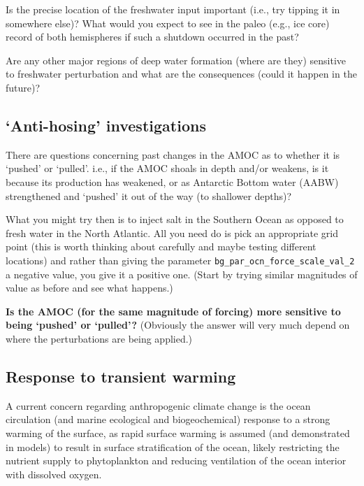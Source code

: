\documentclass[11pt,fleqn]{book} %
\begin{document}
Is the precise location of the freshwater input important (i.e., try tipping it in somewhere else)? What would you expect to see in the paleo (e.g., ice core) record of both hemispheres if such a shutdown occurred in the past?

Are any other major regions of deep water formation (where are they) sensitive to freshwater perturbation and what are the consequences (could it happen in the future)?


\subsection{‘Anti-hosing’ investigations}

There are questions concerning past changes in the AMOC as to whether it is ‘pushed’ or ‘pulled’. i.e., if the AMOC shoals in depth and/or weakens, is it because its production has weakened, or as Antarctic Bottom water (AABW) strengthened and ‘pushed’ it out of the way (to shallower depths)?

What you might try then is to inject salt in the Southern Ocean as opposed to fresh water in the North Atlantic. All you need do is pick an appropriate grid point (this is worth thinking about carefully and maybe testing different locations) and rather than giving the parameter \texttt{bg\_par\_ocn\_force\_scale\_val\_2} a negative value, you give it a positive one. (Start by trying similar magnitudes of value as before and see what happens.)

\textbf{Is the AMOC (for the same magnitude of forcing) more sensitive to being ‘pushed’ or ‘pulled’?} (Obviously the answer will very much depend on where the perturbations are being applied.)


\subsection{Response to transient warming}

A current concern regarding anthropogenic climate change is the ocean circulation (and marine ecological and biogeochemical) response to a strong warming of the surface, as rapid surface warming is assumed (and demonstrated in models) to result in surface stratification of the ocean, likely restricting the nutrient supply to phytoplankton and reducing ventilation of the ocean interior with dissolved oxygen.
\end{document}
